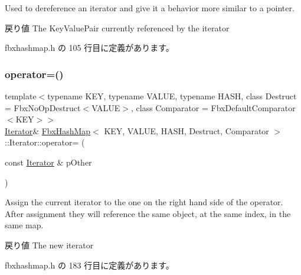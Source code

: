 Used to dereference an iterator and give it a behavior more similar to a pointer. \begin{DoxyReturn}{戻り値}
The Key\+Value\+Pair currently referenced by the iterator 
\end{DoxyReturn}


 fbxhashmap.\+h の 105 行目に定義があります。

\mbox{\label{class_fbx_hash_map_1_1_iterator_a2bacfdaa8a84d7f5bf41447bc35ccc31}} 
\subsubsection{\texorpdfstring{operator=()}{operator=()}}
{\footnotesize\ttfamily template$<$typename K\+EY, typename V\+A\+L\+UE, typename H\+A\+SH, class Destruct = Fbx\+No\+Op\+Destruct$<$\+V\+A\+L\+U\+E$>$, class Comparator = Fbx\+Default\+Comparator$<$\+K\+E\+Y$>$$>$ \\
\hyperlink{class_fbx_hash_map_1_1_iterator}{Iterator}\& \hyperlink{class_fbx_hash_map}{Fbx\+Hash\+Map}$<$ K\+EY, V\+A\+L\+UE, H\+A\+SH, Destruct, Comparator $>$\+::Iterator\+::operator= (\begin{DoxyParamCaption}\item[{const \hyperlink{class_fbx_hash_map_1_1_iterator}{Iterator} \&}]{p\+Other }\end{DoxyParamCaption})\hspace{0.3cm}{\ttfamily [inline]}}

Assign the current iterator to the one on the right hand side of the operator. After assignment they will reference the same object, at the same index, in the same map. \begin{DoxyReturn}{戻り値}
The new iterator 
\end{DoxyReturn}


 fbxhashmap.\+h の 183 行目に定義があります。

\mbox{\label{class_fbx_hash_map_1_1_iterator_aeeba00ddc25c531558c29608ef10d478}} 
